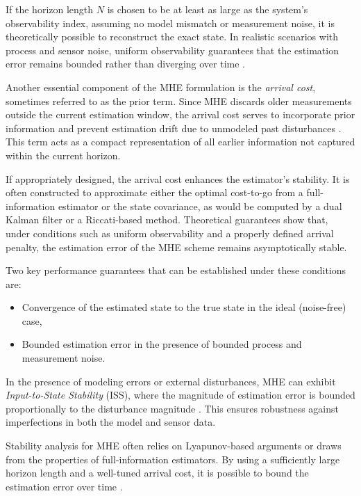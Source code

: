 If the horizon length $N$ is chosen to be at least as large as the system’s observability index, assuming no model mismatch or measurement noise, it is theoretically possible to reconstruct the exact state. In realistic scenarios with process and sensor noise, uniform observability guarantees that the estimation error remains bounded rather than diverging over time \cite{5718126}.

Another essential component of the MHE formulation is the \textit{arrival cost}, sometimes referred to as the prior term. Since MHE discards older measurements outside the current estimation window, the arrival cost serves to incorporate prior information and prevent estimation drift due to unmodeled past disturbances \cite{deniz2019robuststabilitymovinghorizon}. This term acts as a compact representation of all earlier information not captured within the current horizon.

If appropriately designed, the arrival cost enhances the estimator’s stability. It is often constructed to approximate either the optimal cost-to-go from a full-information estimator or the state covariance, as would be computed by a dual Kalman filter or a Riccati-based method. Theoretical guarantees show that, under conditions such as uniform observability and a properly defined arrival penalty, the estimation error of the MHE scheme remains asymptotically stable.

Two key performance guarantees that can be established under these conditions are:
\begin{itemize}
    \item Convergence of the estimated state to the true state in the ideal (noise-free) case,
    \item Bounded estimation error in the presence of bounded process and measurement noise.
\end{itemize}

In the presence of modeling errors or external disturbances, MHE can exhibit \textit{Input-to-State Stability} (ISS), where the magnitude of estimation error is bounded proportionally to the disturbance magnitude \cite{Ji}. This ensures robustness against imperfections in both the model and sensor data.

Stability analysis for MHE often relies on Lyapunov-based arguments or draws from the properties of full-information estimators. By using a sufficiently large horizon length and a well-tuned arrival cost, it is possible to bound the estimation error over time \cite{Schiller_2023}.

